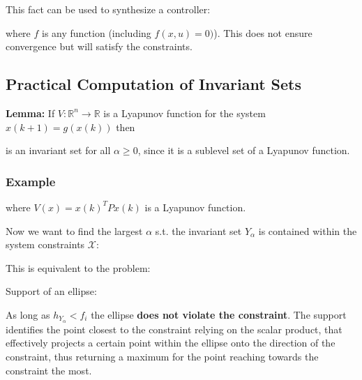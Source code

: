 \documentclass[8pt,a4paper]{scrartcl}
\begin{document}
\begin{multicols*}{3}

This fact can be used to synthesize a controller:


where $f$ is any function (including $f(x,u)=0)$). This does not ensure convergence but will satisfy the constraints.

\subsection{Practical Computation of Invariant Sets}


\textbf{Lemma:} If $V:\mathbb{R}^n\rightarrow\mathbb{R}$ is a Lyapunov function for the system $x(k+1)=g(x(k))$ then


is an invariant set for all $\alpha\geq 0$, since it is a sublevel set of a Lyapunov function.

\subsubsection{Example}


where $V(x)=x(k)^TPx(k)$ is a Lyapunov function.

\vspace{3ex}

Now we want to find the largest $\alpha$ s.t. the invariant set $Y_\alpha$ is contained within the system constraints $\mathcal{X}$:


This is equivalent to the problem:


Support of an ellipse:


As long as $h_{Y_\alpha}<f_i$ the ellipse \textbf{does not violate the constraint}. The support identifies the point closest to the constraint relying on the scalar product, that effectively projects a certain point within the ellipse onto the direction of the constraint, thus returning a maximum for the point reaching towards the constraint the most.


\end{multicols*}
\end{document}

